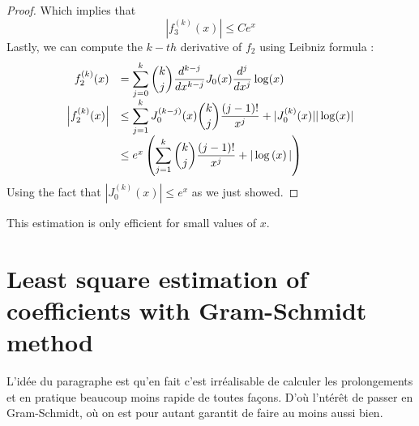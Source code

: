 \documentclass[11pt,a4paper]{article}
\begin{document}
\begin{Lem}
\begin{proof}
Which implies that \[|f_3^{(k)}(x)| \leq C e^x\]
Lastly, we can compute the $k-th$ derivative of $f_2$ using Leibniz formula : 
\[ \begin{array}{rl}
f_2^{(k)}(x) &= \displaystyle\sum_{j=0}^k \dbinom{k}{j} \dfrac{d^{k-j}}{dx^{k-j}}J_0(x) \dfrac{d^{j}}{dx^{j}} \log(x)\\
\left| f_2^{(k)}(x)\right|& \leq \displaystyle\sum_{j=1}^k J_0^{(k-j)}(x)\dbinom{k}{j}\dfrac{(j-1)!}{x^{j}} + |J_0^{(k)}(x)||\log(x)| \\
& \leq e^x \left( \displaystyle\sum_{j=1}^k \dbinom{k}{j}\dfrac{(j-1)!}{x^{j}} + |\log\left(x\right)| \right)
\end{array}\]
Using the fact that $|J_{0}^{(k)}(x)| \leq e^x$ as we just showed.

\end{proof}
\end{Lem}

\begin{Rem} This estimation is only efficient for small values of $x$. 
\end{Rem}

\section{Least square estimation of coefficients with Gram-Schmidt method}

L'idée du paragraphe est qu'en fait c'est irréalisable de calculer les prolongements et en pratique beaucoup moins rapide de toutes façons. D'où l'ntérêt de passer en Gram-Schmidt, où on est pour autant garantit de faire au moins aussi bien. 




 
\end{document}

